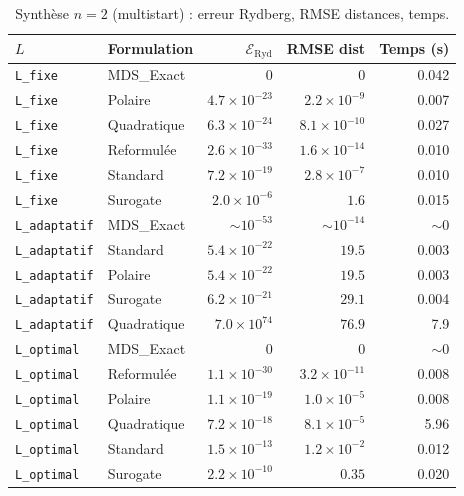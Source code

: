 \documentclass[12pt,a4paper]{article}
\begin{document}
\begin{table}[htbp]
\centering
\small
\begin{tabular}{llrrr}
  \toprule
  $L$ & Formulation & $\mathcal{E}_{\mathrm{Ryd}}$ & RMSE dist & Temps (s) \\
  \midrule
  \texttt{L\_fixe}      & MDS\_Exact   & $0$            & $0$           & 0.042 \\
  \texttt{L\_fixe}      & Polaire      & $4.7\times 10^{-23}$ & $2.2\times 10^{-9}$ & 0.007 \\
  \texttt{L\_fixe}      & Quadratique  & $6.3\times 10^{-24}$ & $8.1\times 10^{-10}$ & 0.027 \\
  \texttt{L\_fixe}      & Reformulée   & $2.6\times 10^{-33}$ & $1.6\times 10^{-14}$ & 0.010 \\
  \texttt{L\_fixe}      & Standard     & $7.2\times 10^{-19}$ & $2.8\times 10^{-7}$ & 0.010 \\
  \texttt{L\_fixe}      & Surogate     & $2.0\times 10^{-6}$  & $1.6$         & 0.015 \\
  \midrule
  \texttt{L\_adaptatif} & MDS\_Exact   & $\sim 10^{-53}$ & $\sim 10^{-14}$ & $\sim 0$ \\
  \texttt{L\_adaptatif} & Standard     & $5.4\times 10^{-22}$ & $19.5$ & 0.003 \\
  \texttt{L\_adaptatif} & Polaire      & $5.4\times 10^{-22}$ & $19.5$ & 0.003 \\
  \texttt{L\_adaptatif} & Surogate     & $6.2\times 10^{-21}$ & $29.1$ & 0.004 \\
  \texttt{L\_adaptatif} & Quadratique  & $7.0\times 10^{74}$  & $76.9$ & 7.9 \\
  \midrule
  \texttt{L\_optimal}   & MDS\_Exact   & $0$            & $0$           & $\sim 0$ \\
  \texttt{L\_optimal}   & Reformulée   & $1.1\times 10^{-30}$ & $3.2\times 10^{-11}$ & 0.008 \\
  \texttt{L\_optimal}   & Polaire      & $1.1\times 10^{-19}$ & $1.0\times 10^{-5}$ & 0.008 \\
  \texttt{L\_optimal}   & Quadratique  & $7.2\times 10^{-18}$ & $8.1\times 10^{-5}$ & 5.96 \\
  \texttt{L\_optimal}   & Standard     & $1.5\times 10^{-13}$ & $1.2\times 10^{-2}$ & 0.012 \\
  \texttt{L\_optimal}   & Surogate     & $2.2\times 10^{-10}$ & $0.35$ & 0.020 \\
  \bottomrule
\end{tabular}
\caption{Synthèse $n=2$ (multistart) : erreur Rydberg, RMSE distances, temps.}
\end{table}
\end{document}
